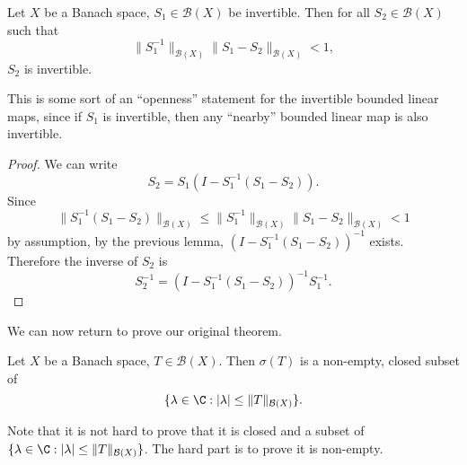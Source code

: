 \documentclass[a4paper]{article}
\begin{document}
\begin{lemma}
  Let $X$ be a Banach space, $S_1 \in \mathcal{B}(X)$ be invertible. Then for all $S_2 \in \mathcal{B}(X)$ such that
  \[
    \|S_1^{-1}\|_{\mathcal{B}(X)} \|S_1 - S_2\|_{\mathcal{B}(X)} < 1,
  \]
  $S_2$ is invertible.
\end{lemma}
This is some sort of an ``openness'' statement for the invertible bounded linear maps, since if $S_1$ is invertible, then any ``nearby'' bounded linear map is also invertible.
\begin{proof}
  We can write
  \[
    S_2 = S_1(I - S_1^{-1}(S_1 - S_2)).
  \]
  Since
  \[
    \|S_1^{-1}(S_1 - S_2)\|_{\mathcal{B}(X)} \leq \|S_1^{-1} \|_{\mathcal{B}(X)} \|S_1 - S_2\|_{\mathcal{B}(X)} < 1
  \]
  by assumption, by the previous lemma, $(I - S_1^{-1}(S_1 - S_2))^{-1}$ exists. Therefore the inverse of $S_2$ is
  \[
    S_2^{-1} = (I - S_1^{-1}(S_1 - S_2))^{-1} S_1^{-1}.
  \]
\end{proof}

We can now return to prove our original theorem.
\begin{thm}
  Let $X$ be a Banach space, $T \in \mathcal{B}(X)$. Then $\sigma(T)$ is a non-empty, closed subset of
  \[
    \{\lambda \in \C: |\lambda| \leq \|T\|_{\mathcal{B}(X)}\}.
  \]
\end{thm}
Note that it is not hard to prove that it is closed and a subset of $\{\lambda \in \C: |\lambda| \leq \|T\|_{\mathcal{B}(X)}\}$. The hard part is to prove it is non-empty.
\end{document}
